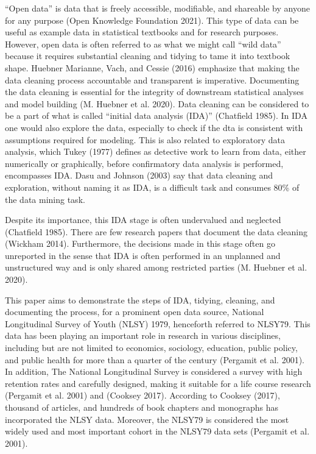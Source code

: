 \documentclass[12pt]{article}
\begin{document}
``Open data'' is data that is freely accessible, modifiable, and shareable by anyone for any purpose (Open Knowledge Foundation 2021). This type of data can be useful as example data in statistical textbooks and for research purposes. However, open data is often referred to as what we might call ``wild data'' because it requires substantial cleaning and tidying to tame it into textbook shape. Huebner Marianne, Vach, and Cessie (2016) emphasize that making the data cleaning process accountable and transparent is imperative. Documenting the data cleaning is essential for the integrity of downstream statistical analyses and model building (M. Huebner et al. 2020).
Data cleaning can be considered to be a part of what is called ``initial data analysis (IDA)'' (Chatfield 1985). In IDA one would also explore the data, especially to check if the dta is consistent with assumptions required for modeling. This is also related to exploratory data analysis, which Tukey (1977) defines as detective work to learn from data, either numerically or graphically, before confirmatory data analysis is performed, encompasses IDA. Dasu and Johnson (2003) say that data cleaning and exploration, without naming it as IDA, is a difficult task and consumes 80\% of the data mining task.

Despite its importance, this IDA stage is often undervalued and neglected (Chatfield 1985). There are few research papers that document the data cleaning (Wickham 2014). Furthermore, the decisions made in this stage often go unreported in the sense that IDA is often performed in an unplanned and unstructured way and is only shared among restricted parties (M. Huebner et al. 2020).

This paper aims to demonstrate the steps of IDA, tidying, cleaning, and documenting the process, for a prominent open data source, National Longitudinal Survey of Youth (NLSY) 1979, henceforth referred to NLSY79. This data has been playing an important role in research in various disciplines, including but are not limited to economics, sociology, education, public policy, and public health for more than a quarter of the century (Pergamit et al. 2001). In addition, The National Longitudinal Survey is considered a survey with high retention rates and carefully designed, making it suitable for a life course research (Pergamit et al. 2001) and (Cooksey 2017). According to Cooksey (2017), thousand of articles, and hundreds of book chapters and monographs has incorporated the NLSY data. Moreover, the NLSY79 is considered the most widely used and most important cohort in the NLSY79 data sets (Pergamit et al. 2001).
\end{document}
